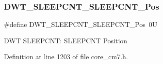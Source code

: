 \subsubsection{\texorpdfstring{D\+W\+T\+\_\+\+S\+L\+E\+E\+P\+C\+N\+T\+\_\+\+S\+L\+E\+E\+P\+C\+N\+T\+\_\+\+Pos}{DWT\_SLEEPCNT\_SLEEPCNT\_Pos}\hspace{0.1cm}{\footnotesize\ttfamily [4/4]}}
{\footnotesize\ttfamily \#define D\+W\+T\+\_\+\+S\+L\+E\+E\+P\+C\+N\+T\+\_\+\+S\+L\+E\+E\+P\+C\+N\+T\+\_\+\+Pos~0U}

D\+WT S\+L\+E\+E\+P\+C\+NT\+: S\+L\+E\+E\+P\+C\+NT Position 

Definition at line 1203 of file core\+\_\+cm7.\+h.


